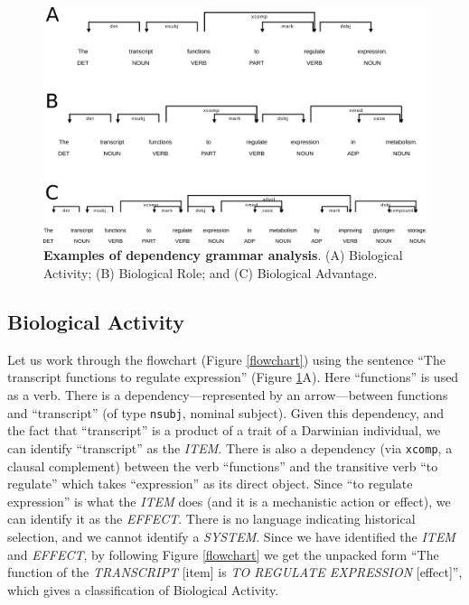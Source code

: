 \documentclass{article}
\begin{document}
\begin{figure}[ht]
  \centering
  \includegraphics[width=\linewidth]{figures/combined_eff_role_adv.png}
  \caption[]{\textbf{Examples of dependency grammar analysis}. (A) Biological Activity; (B) Biological Role; and (C) Biological Advantage.}
  \label{eff_role_adv}
\end{figure}

\subsection{Biological Activity}
\label{sec:biological-activity}

Let us work through the flowchart (Figure \ref{flowchart}) using the sentence ``The transcript functions to regulate expression'' (Figure \ref{eff_role_adv}A).
Here ``functions'' is used as a verb.
There is a dependency---represented by an arrow---between functions and ``transcript'' (of type \texttt{nsubj}, nominal subject).
Given this dependency, and the fact that ``transcript'' is a product of a trait of a Darwinian individual, we can identify ``transcript'' as the \emph{ITEM}.
There is also a dependency (via \texttt{xcomp}, a clausal complement) between the verb ``functions'' and the transitive verb ``to regulate'' which takes ``expression'' as its direct object.
Since ``to regulate expression'' is what the \emph{ITEM} does (and it is a mechanistic action or effect), we can identify it as the \emph{EFFECT}.
There is no language indicating historical selection, and we cannot identify a \emph{SYSTEM}.
Since we have identified the \emph{ITEM} and \emph{EFFECT}, by following Figure \ref{flowchart} we get the unpacked form ``The function of the \emph{TRANSCRIPT} [item] is \emph{TO REGULATE EXPRESSION} [effect]'', which gives a classification of Biological Activity.
\end{document}

